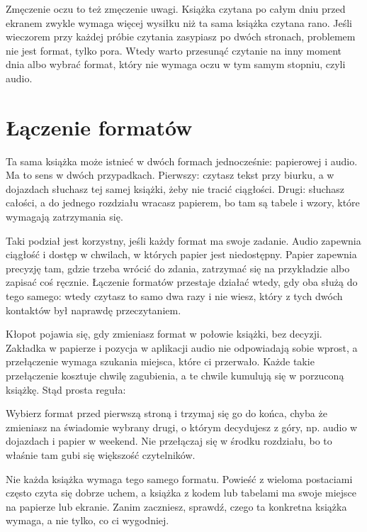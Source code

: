 Zmęczenie oczu to też zmęczenie uwagi. Książka czytana po całym dniu przed ekranem zwykle wymaga więcej wysiłku niż ta sama książka czytana rano. Jeśli wieczorem przy każdej próbie czytania zasypiasz po dwóch stronach, problemem nie jest format, tylko pora. Wtedy warto przesunąć czytanie na inny moment dnia albo wybrać format, który nie wymaga oczu w tym samym stopniu, czyli audio.

\section{Łączenie formatów}

Ta sama książka może istnieć w dwóch formach jednocześnie: papierowej i audio. Ma to sens w dwóch przypadkach. Pierwszy: czytasz tekst przy biurku, a w dojazdach słuchasz tej samej książki, żeby nie tracić ciągłości. Drugi: słuchasz całości, a do jednego rozdziału wracasz papierem, bo tam są tabele i wzory, które wymagają zatrzymania się.

Taki podział jest korzystny, jeśli każdy format ma swoje zadanie. Audio zapewnia ciągłość i dostęp w chwilach, w których papier jest niedostępny. Papier zapewnia precyzję tam, gdzie trzeba wrócić do zdania, zatrzymać się na przykładzie albo zapisać coś ręcznie. Łączenie formatów przestaje działać wtedy, gdy oba służą do tego samego: wtedy czytasz to samo dwa razy i nie wiesz, który z tych dwóch kontaktów był naprawdę przeczytaniem.

Kłopot pojawia się, gdy zmieniasz format w połowie książki, bez decyzji. Zakładka w papierze i pozycja w aplikacji audio nie odpowiadają sobie wprost, a przełączenie wymaga szukania miejsca, które ci przerwało. Każde takie przełączenie kosztuje chwilę zagubienia, a te chwile kumulują się w porzuconą książkę. Stąd prosta reguła:

\begin{zasada}
  Wybierz format przed pierwszą stroną i trzymaj się go do końca, chyba że zmieniasz na świadomie wybrany drugi, o którym decydujesz z góry, np. audio w dojazdach i papier w weekend. Nie przełączaj się w środku rozdziału, bo to właśnie tam gubi się większość czytelników.
\end{zasada}

\begin{uwaga}
  Nie każda książka wymaga tego samego formatu. Powieść z wieloma postaciami często czyta się dobrze uchem, a książka z kodem lub tabelami ma swoje miejsce na papierze lub ekranie. Zanim zaczniesz, sprawdź, czego ta konkretna książka wymaga, a nie tylko, co ci wygodniej.
\end{uwaga}

